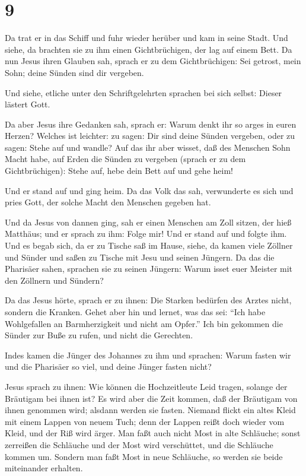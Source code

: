 \hypertarget{section-8}{%
\section{9}\label{section-8}}

 Da trat er in das Schiff und fuhr wieder herüber und kam in
seine Stadt.  Und siehe, da brachten sie zu ihm einen
Gichtbrüchigen, der lag auf einem Bett. Da nun Jesus ihren Glauben sah,
sprach er zu dem Gichtbrüchigen: Sei getrost, mein Sohn; deine Sünden
sind dir vergeben.

 Und siehe, etliche unter den Schriftgelehrten sprachen bei
sich selbst: Dieser lästert Gott.

 Da aber Jesus ihre Gedanken sah, sprach er: Warum denkt ihr
so arges in euren Herzen?  Welches ist leichter: zu sagen:
Dir sind deine Sünden vergeben, oder zu sagen: Stehe auf und wandle?
 Auf das ihr aber wisset, daß des Menschen Sohn Macht habe,
auf Erden die Sünden zu vergeben (sprach er zu dem Gichtbrüchigen):
Stehe auf, hebe dein Bett auf und gehe heim!

 Und er stand auf und ging heim.  Da das Volk
das sah, verwunderte es sich und pries Gott, der solche Macht den
Menschen gegeben hat.

 Und da Jesus von dannen ging, sah er einen Menschen am Zoll
sitzen, der hieß Matthäus; und er sprach zu ihm: Folge mir! Und er stand
auf und folgte ihm.  Und es begab sich, da er zu Tische saß
im Hause, siehe, da kamen viele Zöllner und Sünder und saßen zu Tische
mit Jesu und seinen Jüngern.  Da das die Pharisäer sahen,
sprachen sie zu seinen Jüngern: Warum isset euer Meister mit den
Zöllnern und Sündern?

 Da das Jesus hörte, sprach er zu ihnen: Die Starken
bedürfen des Arztes nicht, sondern die Kranken.  Gehet aber
hin und lernet, was das sei: ``Ich habe Wohlgefallen an Barmherzigkeit
und nicht am Opfer.'' Ich bin gekommen die Sünder zur Buße zu rufen, und
nicht die Gerechten.

 Indes kamen die Jünger des Johannes zu ihm und sprachen:
Warum fasten wir und die Pharisäer so viel, und deine Jünger fasten
nicht?

 Jesus sprach zu ihnen: Wie können die Hochzeitleute Leid
tragen, solange der Bräutigam bei ihnen ist? Es wird aber die Zeit
kommen, daß der Bräutigam von ihnen genommen wird; alsdann werden sie
fasten.  Niemand flickt ein altes Kleid mit einem Lappen
von neuem Tuch; denn der Lappen reißt doch wieder vom Kleid, und der Riß
wird ärger.  Man faßt auch nicht Most in alte Schläuche;
sonst zerreißen die Schläuche und der Most wird verschüttet, und die
Schläuche kommen um. Sondern man faßt Most in neue Schläuche, so werden
sie beide miteinander erhalten.

